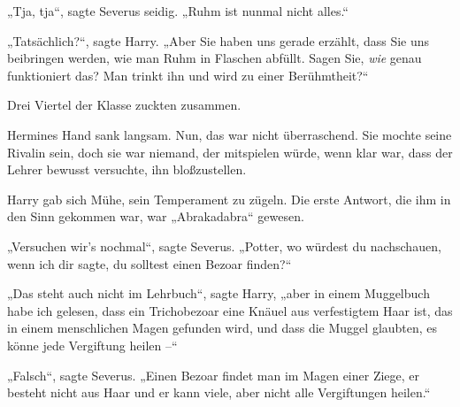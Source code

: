 „Tja, tja“, sagte Severus seidig. „Ruhm ist nunmal nicht alles.“

„Tatsächlich?“, sagte Harry. „Aber Sie haben uns gerade erzählt, dass Sie uns beibringen werden, wie man Ruhm in Flaschen abfüllt. Sagen Sie, \emph{wie} genau funktioniert das? Man trinkt ihn und wird zu einer Berühmtheit?“

Drei Viertel der Klasse zuckten zusammen.

Hermines Hand sank langsam. Nun, das war nicht überraschend. Sie mochte seine Rivalin sein, doch sie war niemand, der mitspielen würde, wenn klar war, dass der Lehrer bewusst versuchte, ihn bloßzustellen.

Harry gab sich Mühe, sein Temperament zu zügeln. Die erste Antwort, die ihm in den Sinn gekommen war, war „Abrakadabra“ gewesen.

„Versuchen wir’s nochmal“, sagte Severus. „Potter, wo würdest du nachschauen, wenn ich dir sagte, du solltest einen Bezoar finden?“

„Das steht auch nicht im Lehrbuch“, sagte Harry, „aber in einem Muggelbuch habe ich gelesen, dass ein Trichobezoar eine Knäuel aus verfestigtem Haar ist, das in einem menschlichen Magen gefunden wird, und dass die Muggel glaubten, es könne jede Vergiftung heilen –“

„Falsch“, sagte Severus. „Einen Bezoar findet man im Magen einer Ziege, er besteht nicht aus Haar und er kann viele, aber nicht alle Vergiftungen heilen.“

